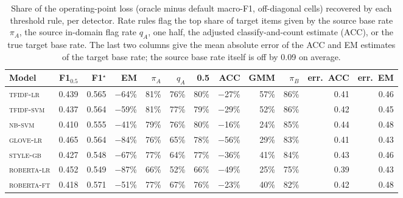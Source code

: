 \begin{table}[h]
\centering
\caption{Share of the operating-point loss (oracle minus default macro-F1, off-diagonal cells) recovered by each threshold rule, per detector. Rate rules flag the top share of target items given by the source base rate $\pi_A$, the source in-domain flag rate $q_A$, one half, the adjusted classify-and-count estimate (ACC), or the true target base rate. The last two columns give the mean absolute error of the ACC and EM estimates of the target base rate; the source base rate itself is off by 0.09 on average.}\label{tab:supp-rates}
\footnotesize
\begin{tabular}{@{}lrrrrrrrrrrr@{}}
\toprule
Model & F1$_{0.5}$ & F1$^\star$ & EM & $\pi_A$ & $q_A$ & 0.5 & ACC & GMM & $\pi_B$ & err.\ ACC & err.\ EM \\
\midrule
\textsc{tfidf-lr} & 0.439 & 0.565 & $-$64\% & 81\% & 76\% & 80\% & $-$27\% & 57\% & 86\% & 0.41 & 0.46 \\
\textsc{tfidf-svm} & 0.437 & 0.564 & $-$59\% & 81\% & 77\% & 79\% & $-$29\% & 52\% & 86\% & 0.42 & 0.45 \\
\textsc{nb-svm} & 0.410 & 0.555 & $-$41\% & 79\% & 76\% & 80\% & $-$16\% & 24\% & 85\% & 0.44 & 0.48 \\
\textsc{glove-lr} & 0.465 & 0.564 & $-$84\% & 76\% & 65\% & 78\% & $-$56\% & 29\% & 83\% & 0.41 & 0.43 \\
\textsc{style-gb} & 0.427 & 0.548 & $-$67\% & 77\% & 64\% & 77\% & $-$36\% & 41\% & 84\% & 0.43 & 0.46 \\
\textsc{roberta-lr} & 0.452 & 0.549 & $-$87\% & 66\% & 52\% & 66\% & $-$49\% & 25\% & 75\% & 0.39 & 0.43 \\
\textsc{roberta-ft} & 0.418 & 0.571 & $-$51\% & 77\% & 67\% & 76\% & $-$23\% & 40\% & 82\% & 0.42 & 0.48 \\
\bottomrule
\end{tabular}
\end{table}

